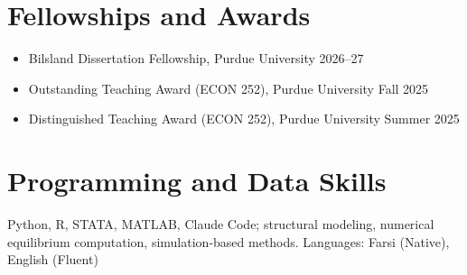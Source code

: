 \documentclass[10pt]{article}
\newenvironment{tight}
  {\begin{itemize}[leftmargin=1.1em,topsep=0.05em,itemsep=0.05em,parsep=0pt]}
  {\end{itemize}}
\begin{document}
\section{Fellowships and Awards}
\begin{tight}
  \item Bilsland Dissertation Fellowship, Purdue University \hfill 2026--27
  \item Outstanding Teaching Award (ECON 252), Purdue University \hfill Fall 2025
  \item Distinguished Teaching Award (ECON 252), Purdue University \hfill Summer 2025
\end{tight}

\section{Programming and Data Skills}
Python, R, STATA, MATLAB, Claude Code; structural modeling, numerical equilibrium computation,
simulation-based methods. \quad Languages: Farsi (Native), English (Fluent)
\end{document}
